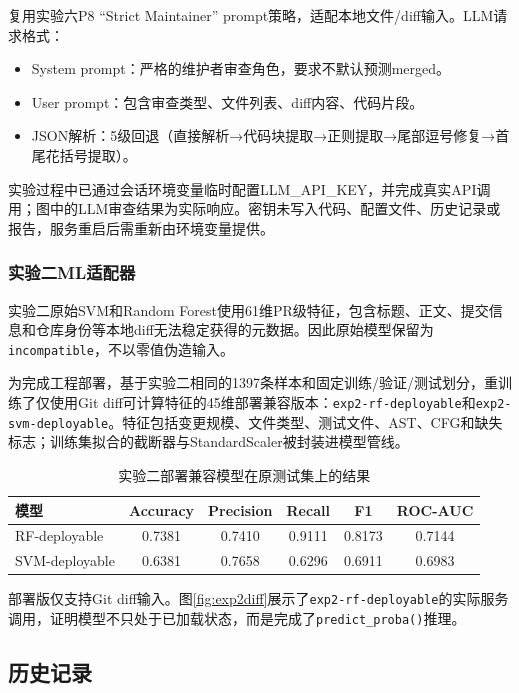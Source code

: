 \documentclass{experimentreport}
\begin{document}
复用实验六P8 ``Strict Maintainer'' prompt策略，适配本地文件/diff输入。LLM请求格式：

\begin{itemize}
  \item System prompt：严格的维护者审查角色，要求不默认预测merged。
  \item User prompt：包含审查类型、文件列表、diff内容、代码片段。
  \item JSON解析：5级回退（直接解析→代码块提取→正则提取→尾部逗号修复→首尾花括号提取）。
\end{itemize}

实验过程中已通过会话环境变量临时配置LLM\_API\_KEY，并完成真实API调用；图中的LLM审查结果为实际响应。密钥未写入代码、配置文件、历史记录或报告，服务重启后需重新由环境变量提供。

\subsubsection{实验二ML适配器}

实验二原始SVM和Random Forest使用61维PR级特征，包含标题、正文、提交信息和仓库身份等本地diff无法稳定获得的元数据。因此原始模型保留为\texttt{incompatible}，不以零值伪造输入。

为完成工程部署，基于实验二相同的1397条样本和固定训练/验证/测试划分，重训练了仅使用Git diff可计算特征的45维部署兼容版本：\texttt{exp2-rf-deployable}和\texttt{exp2-svm-deployable}。特征包括变更规模、文件类型、测试文件、AST、CFG和缺失标志；训练集拟合的截断器与StandardScaler被封装进模型管线。

\begin{table}[h]
\centering
\caption{实验二部署兼容模型在原测试集上的结果}
\begin{tabular}{lccccc}
\hline
模型 & Accuracy & Precision & Recall & F1 & ROC-AUC \\
\hline
RF-deployable & 0.7381 & 0.7410 & 0.9111 & 0.8173 & 0.7144 \\
SVM-deployable & 0.6381 & 0.7658 & 0.6296 & 0.6911 & 0.6983 \\
\hline
\end{tabular}
\end{table}

部署版仅支持Git diff输入。图\ref{fig:exp2diff}展示了\texttt{exp2-rf-deployable}的实际服务调用，证明模型不只处于已加载状态，而是完成了\texttt{predict\_proba()}推理。

\subsection{历史记录}
\end{document}
